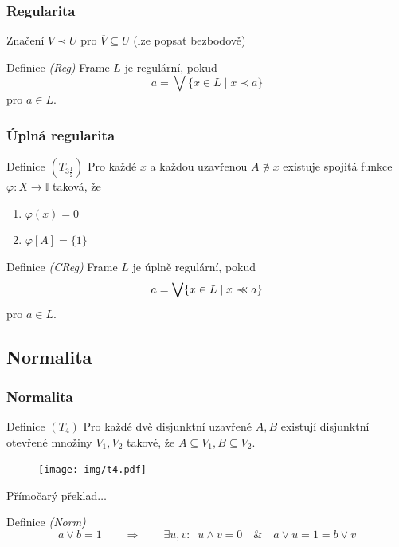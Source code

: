 \documentclass[mathserif]{beamer}
\newcommand{\rb}{\prec}
\newcommand{\st}{\mid}
\newcommand{\I}{\mathbb{I}}
\renewcommand{\phi}{\varphi}
\newcommand{\cb}{\prec\mkern-8mu\prec}
\begin{document}

\begin{frame}
\frametitle{Regularita}

Značení \alert{$V \rb U$} pro $\overline{V} \subseteq U$
\pause
(lze popsat bezbodově)

\pause

\begin{block}{Definice \textit{(Reg)}}
  Frame $L$ je \alert{regulární}, pokud
  \[
    a = \bigvee \{x \in L \st x \rb a\}
  \]
  pro $a\in L$.
\end{block}
\end{frame}


\begin{frame}
\frametitle{Úplná regularita}

\begin{block}{Definice $(T_{3\frac{1}{2}})$}
  Pro každé $x$ a každou uzavřenou $A \not\owns x$ existuje spojitá funkce
  $\phi\colon X \to \I$ taková, že
  \begin{enumerate}
    \item $\phi(x) = 0$
    \item $\phi[A] = \{1\}$
  \end{enumerate}
\end{block}
\pause

\begin{block}{Definice \textit{(CReg)}}
  Frame $L$ je \alert{úplně regulární}, pokud
  \[
    a = \bigvee \{x \in L \st x \cb a\}
  \]
  pro $a\in L$.
\end{block}
\end{frame}


\subsection{Normalita}

\begin{frame}
\frametitle{Normalita}
\begin{block}{Definice $(T_4)$}
  Pro každé dvě disjunktní uzavřené $A, B$ existují disjunktní otevřené množiny
  $V_1, V_2$ takové, že $A \subseteq V_1, B \subseteq V_2$.
\end{block}

\begin{figure}
  \texttt{[image: img/t4.pdf]}
\end{figure}
\pause

Přímočarý překlad$\ldots$
\pause
\begin{block}{Definice \textit{(Norm)}}
  \vspace{-1.2em}
  \[
    a \vee b = 1 \qquad \Rightarrow \qquad \exists u, v\colon \;\; u \wedge v
    = 0 \quad \& \quad a \vee u = 1 = b \vee v
  \]
\end{block}
\end{frame}
\end{document}
